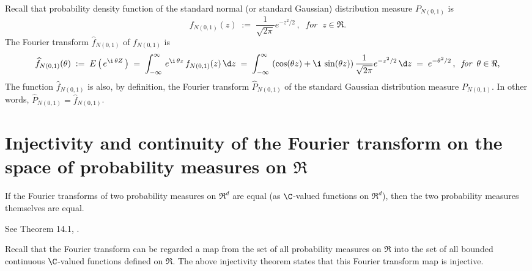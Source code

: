 \documentclass{article}
\begin{document}
Recall that probability density function of the standard normal (or standard Gaussian) distribution measure $P_{N(0,1)}$ is
\begin{equation*}
f_{N(0,1)}(z) \; := \; \dfrac{1}{\sqrt{2\pi}} e^{-z^{2}/2} \,,
\;\;\textit{for}\;\; z \in \Re.
\end{equation*}
The Fourier transform $\widehat{f}_{N(0,1)}$ of $f_{N(0,1)}$ is
\begin{equation*}
\widehat{f}_{N(0,1)}(\theta)
\; := \; E\left(\,e^{\i\,\theta Z}\,\right)
\; = \; \int_{-\infty}^{\infty}\, e^{\i\,\theta z} \, f_{N(0,1)}(z) \,\d z
\; = \; \int_{-\infty}^{\infty}\, \left(\cos(\theta z)+\i\,\sin(\theta z)\right) \dfrac{1}{\sqrt{2\pi}} e^{-z^{2}/2} \,\d z
\; = \; e^{-\theta^{2}/2} \,,
\;\;\textit{for}\;\; \theta \in \Re,
\end{equation*}
The function $\widehat{f}_{N(0,1)}$ is also, by definition, the Fourier transform $\widehat{P}_{N(0,1)}$ of the standard Gaussian distribution measure $P_{N(0,1)}$.  In other words, $\widehat{P}_{N(0,1)} = \widehat{f}_{N(0,1)}$.


\section{Injectivity and continuity of the Fourier transform on the space of probability measures on $\Re$}
\setcounter{theorem}{0}

\begin{theorem}\label{UniquenessTheorem} \mbox{} \vskip 0.1cm \noindent
If the Fourier transforms of two probability measures on $\Re^{d}$ are equal (as $\C$-valued functions on $\Re^{d}$), then the two probability measures themselves are equal.
\end{theorem}
See Theorem 14.1, \cite{JacodProtter}.

\begin{remark} \mbox{} \vskip 0.1cm \noindent
Recall that the Fourier transform can be regarded a map from the set of all probability measures on $\Re$ into the set of all bounded continuous $\C$-valued functions defined on $\Re$.  The above injectivity theorem states that this Fourier transform map is injective.
\end{remark}
\end{document}
